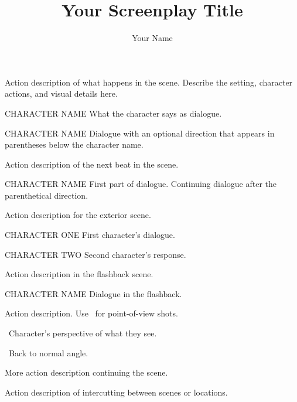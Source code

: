\documentclass[12pt,letterpaper]{screenplay}
\title{Your Screenplay Title}
\author{Your Name}
\begin{document}
\coverpage

\fadein


Action description of what happens in the scene. Describe the setting, character actions, and visual details here.

\begin{dialogue}{CHARACTER NAME}
What the character says as dialogue.
\end{dialogue}

\begin{dialogue}{CHARACTER NAME}
Dialogue with an optional direction that appears in parentheses below the character name.
\end{dialogue}

Action description of the next beat in the scene.

\begin{dialogue}{CHARACTER NAME}
First part of dialogue.
Continuing dialogue after the parenthetical direction.
\end{dialogue}


Action description for the exterior scene.

\begin{dialogue}{CHARACTER ONE}
First character's dialogue.
\end{dialogue}

\begin{dialogue}{CHARACTER TWO}
Second character's response.
\end{dialogue}



Action description in the flashback scene.

\begin{dialogue}{CHARACTER NAME}
Dialogue in the flashback.
\end{dialogue}


Action description. Use \pov\ for point-of-view shots.

\pov\ Character's perspective of what they see.

\revert\ Back to normal angle.

More action description continuing the scene.

\intercut

Action description of intercutting between scenes or locations.

\fadeout

\theend
\end{document}
